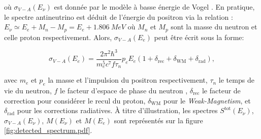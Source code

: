 \bigbreak


où $\sigma_{V-A}(E_\nu)$ est donnée par le modèle à basse énergie de Vogel \cite{Vogel:1983hi}. En pratique, le spectre antineutrino est déduit de l'énergie du positron via la relation : $E_\nu \simeq E_e + M_n - M_p = E_e + \SI{1.806}{MeV}$ où $M_n$ et $M_p$ sont la masse du neutron et celle proton respectivement. Alors, $\sigma_{V-A}(E_e)$ peut être écrit sous la forme:

\begin{equation}
    \sigma_{V-A}(E_e) = \frac{2\pi^2\hbar^3}{m_e^5c^7f\tau_n} p_e E_e \left(1 + \delta_\textrm{rec} + \delta_\textrm{WM} + \delta_\textrm{rad} \right),
\end{equation}

avec $m_e$ et $p_e$ la masse et l'impulsion du positron respectivement, $\tau_n$ le temps de vie du neutron, $f$ le facteur d'espace de phase du neutron \cite{Wilkinson:1998hx}, $\delta_\textrm{rec}$ le facteur de correction pour considérer le recul du proton, $\delta_\textrm{WM}$ pour le \textit{Weak-Magnetism}, et $\delta_\textrm{rad}$ pour les corrections radiatives. À titre d'illustration, les spectres $S^\textrm{tot}(E_\nu)$, $\sigma_{V-A}(E_\nu)$, $M(E_\nu)$ et $M(E_e)$ sont représentés sur la figure \ref{fig:detected_spectrum.pdf}.\\

